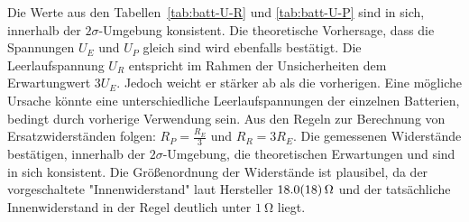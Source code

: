 Die Werte aus den Tabellen~\ref{tab:batt-U-R} und \ref{tab:batt-U-P} sind in sich, innerhalb der  $2\sigma$-Umgebung konsistent. 
Die theoretische Vorhersage, dass die Spannungen $U_E$ und $U_P$ gleich sind wird ebenfalls bestätigt. Die Leerlaufspannung $U_R$ entspricht im Rahmen der Unsicherheiten dem Erwartungwert $3U_E$. Jedoch weicht er stärker ab als die vorherigen. Eine mögliche Ursache könnte eine unterschiedliche Leerlaufspannungen der einzelnen Batterien, bedingt durch vorherige Verwendung sein. Aus den Regeln zur Berechnung von Ersatzwiderständen folgen: $R_P=\frac{R_E}{3}$ und $R_R=3R_E$.
Die gemessenen Widerstände bestätigen, innerhalb der $2\sigma$-Umgebung, die theoretischen Erwartungen und sind in sich konsistent. Die Größenordnung der Widerstände ist plausibel, da der vorgeschaltete "Innenwiderstand" laut Hersteller $\SI{18.0+-1.8}{\ohm}$ und der tatsächliche Innenwiderstand in der Regel  deutlich unter $\SI{1}{\ohm}$ liegt. %



